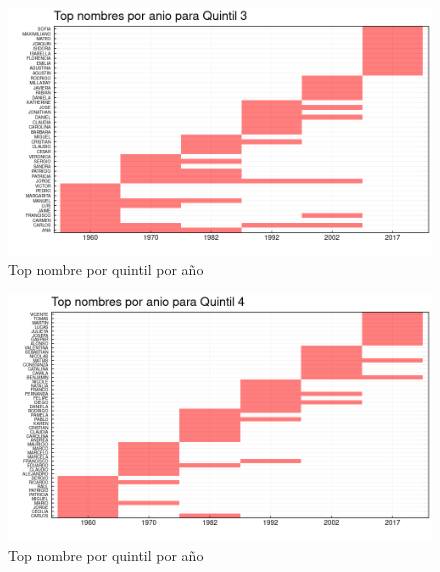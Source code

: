 \begin{landscape}
\begin{figure}[H]
\begin{center}
    \includegraphics[width=22cm]{plot/top_quintil_3.png}
    \caption{Top nombre por quintil por año}
    \label{fig:top_quintil_3}
\end{center}
\end{figure}
\end{landscape}


\begin{landscape}
\begin{figure}[H]
\begin{center}
    \includegraphics[width=22cm]{plot/top_quintil_4.png}
    \caption{Top nombre por quintil por año}
    \label{fig:top_quintil_4}
\end{center}
\end{figure}
\end{landscape}



